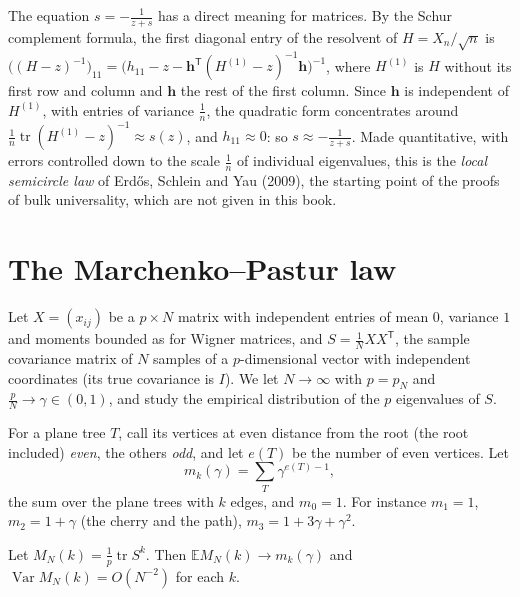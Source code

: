 \begin{remark}
The equation $s=-\frac1{z+s}$ has a direct meaning for matrices. By the Schur complement formula, the first diagonal entry of the resolvent of $H=X_n/\sqrt n$ is
$\bigl((H-z)^{-1}\bigr)_{11}=\bigl(h_{11}-z-\mathbf h^{\mathsf T}(H^{(1)}-z)^{-1}\mathbf h\bigr)^{-1}$, where $H^{(1)}$ is $H$ without its first row and column and $\mathbf h$ the rest of the first column. Since $\mathbf h$ is independent of
$H^{(1)}$, with entries of variance $\frac1n$, the quadratic form concentrates around $\frac1n\operatorname{tr}(H^{(1)}-z)^{-1}\approx s(z)$, and $h_{11}\approx0$: so $s\approx-\frac1{z+s}$. Made quantitative, with errors controlled down to the
scale $\frac1n$ of individual eigenvalues, this is the \emph{local semicircle law} of Erd\H os, Schlein and Yau (2009), the starting point of the proofs of bulk universality, which are not given in this book.
\end{remark}

\section{The Marchenko--Pastur law}

Let $X=(x_{ij})$ be a $p\times N$ matrix with independent entries of mean $0$, variance $1$ and moments bounded as for Wigner matrices, and $S=\frac1NXX^{\mathsf T}$, the sample covariance matrix of $N$ samples of a
$p$-dimensional vector with independent coordinates (its true covariance is $I$). We let $N\to\infty$ with $p=p_N$ and $\frac pN\to\gamma\in(0,1)$, and study the empirical distribution of the $p$ eigenvalues of $S$.

For a plane tree $T$, call its vertices at even distance from the root (the root included) \emph{even}, the others \emph{odd}, and let $e(T)$ be the number of even vertices. Let
\[
m_k(\gamma)=\sum_{T}\gamma^{e(T)-1},
\]
the sum over the plane trees with $k$ edges, and $m_0=1$. For instance $m_1=1$, $m_2=1+\gamma$ (the cherry and the path), $m_3=1+3\gamma+\gamma^2$.

\begin{lemma}\label{lem:mpmoments}
Let $M_N(k)=\frac1p\operatorname{tr}S^k$. Then $\mathbb EM_N(k)\to m_k(\gamma)$ and $\operatorname{Var}M_N(k)=O(N^{-2})$ for each $k$.
\end{lemma}

